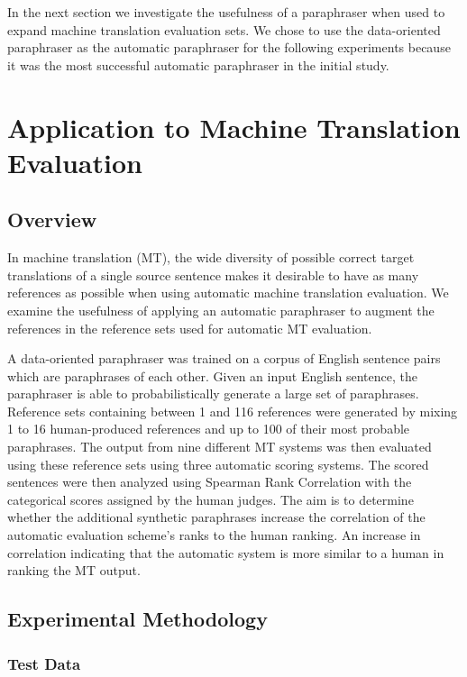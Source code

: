 In the next section we investigate the usefulness of a paraphraser when used to expand machine translation
evaluation sets. We chose to use the data-oriented paraphraser as the automatic paraphraser for the following
experiments because it was the most successful automatic paraphraser in the initial study.




\section{Application to Machine Translation Evaluation}
\label{sec:application}

\subsection{Overview}
\label{sec:overview}

In machine translation (MT), the wide diversity of possible correct target translations of a single source
sentence makes it desirable to have as many references as possible when using automatic machine translation
evaluation. We examine the usefulness of applying an automatic paraphraser to augment the references in
the reference sets used for automatic MT evaluation. 

A data-oriented paraphraser was trained on a corpus of English sentence pairs which are paraphrases of each
other. Given an input English sentence, the paraphraser is able to probabilistically generate a large set of
paraphrases. Reference sets containing between 1 and 116 references were generated by mixing 1 to 16
human-produced references and up to 100 of their most probable paraphrases. The output from nine different MT
systems was then evaluated using these reference sets using three automatic scoring systems. The scored
sentences were then analyzed using Spearman Rank Correlation with the categorical scores assigned by the human
judges. The aim is to determine whether the additional synthetic paraphrases increase the correlation of the
automatic evaluation scheme's ranks to the human ranking. An increase in correlation indicating that the
automatic system is more similar to a human in ranking the MT output.

\subsection{Experimental Methodology}
\label{sec:application:methodolody}

\subsubsection{Test Data}

